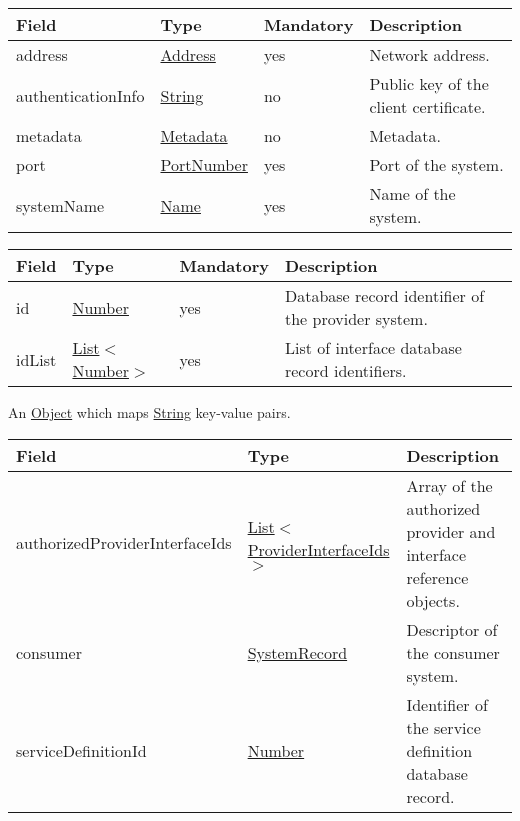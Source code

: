 \documentclass[a4paper]{arrowhead}
\newcommand{\pref}[1]{{\textcolor{ArrowheadGrey}{\hyperref[sec:model:primitives:#1]{#1}}}}
\begin{document}
\label{sec:model:SystemDescriptor}

\begin{table}[ht!]
\begin{tabularx}{\textwidth}{| p{3cm} | p{3cm} | p{2cm} | X |} \hline
\rowcolor{gray!33} Field & Type & Mandatory & Description \\ \hline
address & \pref{Address} & yes & Network address. \\ \hline
authenticationInfo & \pref{String} & no & Public key of the client certificate. \\ \hline
metadata & \hyperref[sec:model:Metadata]{Metadata} & no & Metadata. \\ \hline
port & \pref{PortNumber} & yes & Port of the system. \\ \hline
systemName &\pref{Name} & yes & Name of the system. \\ \hline
\end{tabularx}
\end{table}

\label{sec:model:ProviderInterfaceIds}

\begin{table}[ht!]
\begin{tabularx}{\textwidth}{| p{3cm} | p{3cm} | p{2cm} | X |} \hline
\rowcolor{gray!33} Field & Type & Mandatory & Description \\ \hline
id & \pref{Number} & yes & Database record identifier of the provider system. \\ \hline
idList & \pref{List}$<$\pref{Number}$>$ & yes & List of interface database record identifiers. \\ \hline
\end{tabularx}
\end{table}

\label{sec:model:Metadata}

An \pref{Object} which maps \pref{String} key-value pairs.

\clearpage

\label{sec:model:CheckAuthRuleResponse}
 
\begin{table}[ht!]
\begin{tabularx}{\textwidth}{| p{5cm} | p{5cm} | X |} \hline
\rowcolor{gray!33} Field & Type & Description \\ \hline
authorizedProviderInterfaceIds & \pref{List}$<$\hyperref[sec:model:ProviderInterfaceIds]{ProviderInterfaceIds}$>$ & Array of the authorized provider and interface reference objects. \\ \hline
consumer & \hyperref[sec:model:SystemRecord]{SystemRecord} &  Descriptor of the consumer system. \\ \hline
serviceDefinitionId &\pref{Number} & Identifier of the service definition database record. \\ \hline
\end{tabularx}
\end{table}
\end{document}
